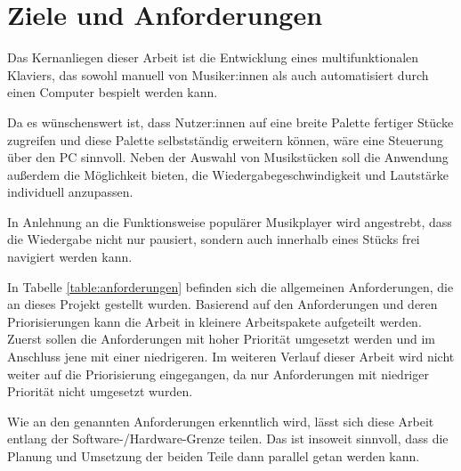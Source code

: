 \chapter{Ziele und Anforderungen} \label{Zielstellung}


Das Kernanliegen dieser Arbeit ist die Entwicklung eines multifunktionalen Klaviers,
das sowohl manuell von Musiker:innen als auch automatisiert durch einen Computer bespielt werden kann.

Da es wünschenswert ist, dass Nutzer:innen auf eine breite Palette fertiger Stücke zugreifen und diese Palette selbstständig erweitern können,
wäre eine Steuerung über den PC sinnvoll.
Neben der Auswahl von Musikstücken soll die Anwendung außerdem die Möglichkeit bieten,
die Wiedergabegeschwindigkeit und Lautstärke individuell anzupassen.

In Anlehnung an die Funktionsweise populärer Musikplayer wird angestrebt,
dass die Wiedergabe nicht nur pausiert, sondern auch innerhalb eines Stücks frei navigiert werden kann.

In Tabelle \ref{table:anforderungen} befinden sich die allgemeinen Anforderungen, die an dieses Projekt gestellt wurden.
Basierend auf den Anforderungen und deren Priorisierungen kann die Arbeit in kleinere Arbeitspakete aufgeteilt werden.
Zuerst sollen die Anforderungen mit hoher Priorität umgesetzt werden und im Anschluss jene mit einer niedrigeren.
Im weiteren Verlauf dieser Arbeit wird nicht weiter auf die Priorisierung eingegangen, da nur Anforderungen mit niedriger Priorität nicht umgesetzt wurden.

Wie an den genannten Anforderungen erkenntlich wird, lässt sich diese Arbeit entlang der Software-/Hardware-Grenze teilen.
Das ist insoweit sinnvoll, dass die Planung und Umsetzung der beiden Teile dann parallel getan werden kann.

